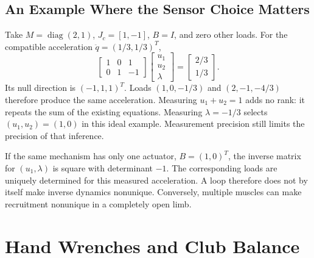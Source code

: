 \subsection{An Example Where the Sensor Choice Matters}

Take $M=\operatorname{diag}(2,1)$, $J_c=[1,-1]$, $B=I$, and zero other loads.
For the compatible acceleration $\ddot q=(1/3,1/3)^T$,
\begin{equation}
 \begin{bmatrix}1&0&1\\0&1&-1\end{bmatrix}
 \begin{bmatrix}u_1\\u_2\\\lambda\end{bmatrix}
 =\begin{bmatrix}2/3\\1/3\end{bmatrix}.
 \label{eq:inverse_rank_example}
\end{equation}
Its null direction is $(-1,1,1)^T$. Loads $(1,0,-1/3)$ and $(2,-1,-4/3)$
therefore produce the same acceleration. Measuring $u_1+u_2=1$ adds no rank:
it repeats the sum of the existing equations. Measuring $\lambda=-1/3$ selects
$(u_1,u_2)=(1,0)$ in this ideal example. Measurement precision still limits the
precision of that inference.

If the same mechanism has only one actuator, $B=(1,0)^T$, the inverse matrix
for $(u_1,\lambda)$ is square with determinant $-1$. The corresponding loads
are uniquely determined for this measured acceleration. A loop therefore does
not by itself make inverse dynamics nonunique. Conversely, multiple muscles can
make recruitment nonunique in a completely open limb.

\section{Hand Wrenches and Club Balance}
\label{sec:instrumented_clubs}

